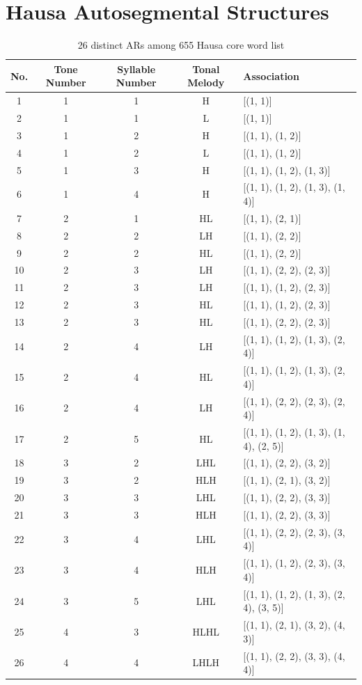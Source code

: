 \documentclass[11pt,letterpaper]{article}
\begin{document}
\section{Hausa Autosegmental Structures}\label{apx:ar}
\begin{table}[H]
	\centering
	\begin{tabular}{ccccl}
		\hline
		\textbf{No.} &\textbf{Tone Number} & \textbf{Syllable Number} & \textbf{Tonal Melody} & \textbf{Association} \\
		\hline
	1	&1 & 1 & H & [(1, 1)] \\
	2	&1 & 1 & L & [(1, 1)] \\
	3	&1 & 2 & H & [(1, 1), (1, 2)] \\
	4	&1 & 2 & L & [(1, 1), (1, 2)] \\
	5	&1 & 3 & H & [(1, 1), (1, 2), (1, 3)] \\
	6	&1 & 4 & H & [(1, 1), (1, 2), (1, 3), (1, 4)] \\
	7&	2 & 1 & HL & [(1, 1), (2, 1)] \\
8	&	2 & 2 & LH & [(1, 1), (2, 2)] \\
9	&	2 & 2 & HL & [(1, 1), (2, 2)] \\
10	&	2 & 3 & LH & [(1, 1), (2, 2), (2, 3)] \\
11	&	2 & 3 & LH & [(1, 1), (1, 2), (2, 3)] \\
12	&	2 & 3 & HL & [(1, 1), (1, 2), (2, 3)] \\
13	&	2 & 3 & HL & [(1, 1), (2, 2), (2, 3)] \\
14	&	2 & 4 & LH & [(1, 1), (1, 2), (1, 3), (2, 4)] \\
15	&	2 & 4 & HL & [(1, 1), (1, 2), (1, 3), (2, 4)] \\
16	&	2 & 4 & LH & [(1, 1), (2, 2), (2, 3), (2, 4)] \\
17	&	2 & 5 & HL & [(1, 1), (1, 2), (1, 3), (1, 4), (2, 5)] \\
18	&	3 & 2 & LHL & [(1, 1), (2, 2), (3, 2)] \\
19	&	3 & 2 & HLH & [(1, 1), (2, 1), (3, 2)] \\
20	&	3 & 3 & LHL & [(1, 1), (2, 2), (3, 3)] \\
21	&	3 & 3 & HLH & [(1, 1), (2, 2), (3, 3)] \\
22	&	3 & 4 & LHL & [(1, 1), (2, 2), (2, 3), (3, 4)] \\
23	&	3 & 4 & HLH & [(1, 1), (1, 2), (2, 3), (3, 4)] \\
24	&	3 & 5 & LHL & [(1, 1), (1, 2), (1, 3), (2, 4), (3, 5)] \\
25	&	4 & 3 & HLHL & [(1, 1), (2, 1), (3, 2), (4, 3)] \\
26	&	4 & 4 & LHLH & [(1, 1), (2, 2), (3, 3), (4, 4)] \\
		\hline
	\end{tabular}
	\caption{26 distinct ARs among 655 Hausa core word list}
	\label{tab:patterns}
\end{table}
\end{document}
